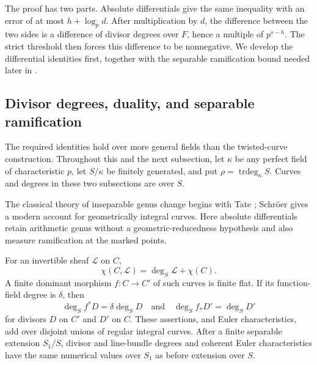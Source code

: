 The proof has two parts. Absolute differentials give the same
inequality with an error of at most $h+\log_p d$. After multiplication
by $d$, the difference between the two sides is a difference of
divisor degrees over $F$, hence a multiple of $p^{s-h}$. The strict
threshold then forces this difference to be nonnegative. We develop
the differential identities first, together with the separable
ramification bound needed later in .

\subsection{Divisor degrees, duality, and separable ramification}

The required identities hold over more general fields than the
twisted-curve construction. Throughout this and the next subsection,
let $\kappa$ be any perfect field of characteristic $p$, let
$S/\kappa$ be finitely generated, and put
$\rho=\operatorname{trdeg}_\kappa S$. Curves and degrees in these two
subsections are over $S$.

The classical theory of inseparable genus change begins with Tate
\cite{Tate1952}; Schr\"oer \cite{Schroer2009} gives a modern account
for geometrically integral curves. Here absolute differentials retain
arithmetic genus without a geometric-reducedness hypothesis and also
measure ramification at the marked points.

\begin{lemma}
\label{lem:curve-degrees}
For an invertible sheaf $\mathcal L$ on $C$,
\begin{equation}
 \chi(C,\mathcal L)=\deg_S\mathcal L+\chi(C).
 \label{eq:curve-euler-degree}
\end{equation}
A finite dominant morphism $f:C\to C'$ of such curves is finite flat.  If
its function-field degree is $\delta$, then
\[
 \deg_S f^*D=\delta\deg_S D
 \quad\text{and}\quad
 \deg_S f_*D'=\deg_S D'
\]
for divisors $D$ on $C'$ and $D'$ on $C$.  These assertions, and Euler
characteristics, add over disjoint unions of regular integral curves.
After a finite separable extension $S_1/S$, divisor and line-bundle degrees
and coherent Euler characteristics have the same numerical values over
$S_1$ as before extension over $S$.
\end{lemma}

